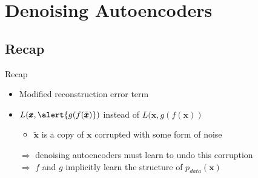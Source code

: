 \documentclass[handout]{beamer}
\begin{document}
\section{Denoising Autoencoders}
\subsection{Recap}
\begin{frame}[t]{Recap}
    \begin{itemize}
        \item Modified reconstruction error term
        \item $L(\pmb{x}, \alert{g(f(\tilde{\pmb{x}})})$ instead of $L(\pmb{x}, g(f(\pmb{x}))$   
            \begin{itemize}
            \item $\tilde{\pmb{x}}$ is a copy of $\pmb{x}$ corrupted with some form of noise\\
            \end{itemize}
            $\Rightarrow$ denoising autoencoders must learn to undo this corruption \\
            $\Rightarrow$ $f$ and $g$ implicitly learn the structure of $p_{data}(\pmb{x})$
    \end{itemize}
\end{frame}
\end{document}
